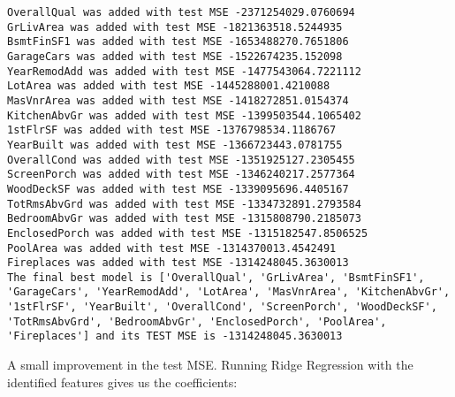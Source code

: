 \documentclass[11pt]{article}
\begin{document}
    \begin{Verbatim}[commandchars=\\\{\}]
OverallQual was added with test MSE -2371254029.0760694
GrLivArea was added with test MSE -1821363518.5244935
BsmtFinSF1 was added with test MSE -1653488270.7651806
GarageCars was added with test MSE -1522674235.152098
YearRemodAdd was added with test MSE -1477543064.7221112
LotArea was added with test MSE -1445288001.4210088
MasVnrArea was added with test MSE -1418272851.0154374
KitchenAbvGr was added with test MSE -1399503544.1065402
1stFlrSF was added with test MSE -1376798534.1186767
YearBuilt was added with test MSE -1366723443.0781755
OverallCond was added with test MSE -1351925127.2305455
ScreenPorch was added with test MSE -1346240217.2577364
WoodDeckSF was added with test MSE -1339095696.4405167
TotRmsAbvGrd was added with test MSE -1334732891.2793584
BedroomAbvGr was added with test MSE -1315808790.2185073
EnclosedPorch was added with test MSE -1315182547.8506525
PoolArea was added with test MSE -1314370013.4542491
Fireplaces was added with test MSE -1314248045.3630013
The final best model is ['OverallQual', 'GrLivArea', 'BsmtFinSF1', 'GarageCars', 'YearRemodAdd', 'LotArea', 'MasVnrArea', 'KitchenAbvGr', '1stFlrSF', 'YearBuilt', 'OverallCond', 'ScreenPorch', 'WoodDeckSF', 'TotRmsAbvGrd', 'BedroomAbvGr', 'EnclosedPorch', 'PoolArea', 'Fireplaces'] and its TEST MSE is -1314248045.3630013

    \end{Verbatim}

    A small improvement in the test MSE. Running Ridge Regression with the
identified features gives us the coefficients:
\end{document}
